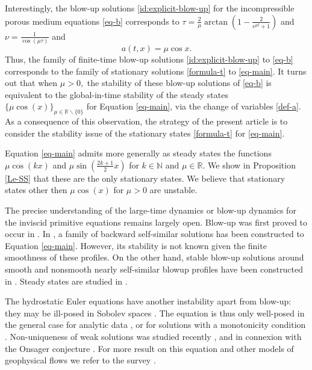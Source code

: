 \documentclass[12pt]{amsart}
\numberwithin{equation}{section}
\def\R{{\mathbb R}}
\numberwithin{equation}{section}
\begin{document}
\medskip

Interestingly, the blow-up solutions \eqref{id:explicit-blow-up} for the incompressible porous medium equations \eqref{eq-b} corresponds to $  \tau=\frac{2}{\mu}\arctan\left(1-\frac{2}{e^{\mu t}+1}\right)$ and $\nu= \frac{1}{\cos(\mu \tau)}$ and
   \begin{equation}\label{formula-t}
a(t,x)= \mu \cos x.
  \end{equation}
Thus, the family of finite-time blow-up solutions \eqref{id:explicit-blow-up} to \eqref{eq-b} corresponds to the family of stationary solutions \eqref{formula-t} to \eqref{eq-main}. It turns out  that  when $\mu>0,$ the  stability  of these blow-up solutions of \eqref{eq-b} is equivalent to  the  global-in-time stability  of the  steady states $\{\mu\cos(x)\}_{\mu\in\R\backslash\{0\}}$  for  Equation \eqref{eq-main},  via the change of variables \eqref{def-a}.    As a consequence of this observation, the strategy of the present article is to consider the stability issue of the stationary states \eqref{formula-t} for \eqref{eq-main}. 

Equation \eqref{eq-main} admits more generally as steady states the functions $\mu \cos(kx)$ and $\mu \sin(\frac{2k+1}{2}x)$ for $k\in \mathbb N$ and $\mu\in \mathbb R$. We show in Proposition \ref{Le-SS} that these are the only stationary states. We believe that stationary states other then $\mu \cos (x)$ for $\mu>0$ are unstable.

\medskip

The precise understanding of the large-time dynamics or blow-up dynamics for the inviscid primitive equations remains largely open. Blow-up was first proved to occur in \cite{CINT,Wo}. In \cite{CINT},  a family of backward self-similar solutions has been constructed to Equation \eqref{eq-main}.  However,  its stability is not known given the finite smoothness of these profiles.   On the other hand,    stable blow-up solutions around smooth and nonsmooth nearly self-similar blowup profiles have been constructed in  \cite{CIL}. Steady states are studied in \cite{LWX}.


The hydrostatic Euler equations have another instability apart from blow-up: they may be ill-posed in Sobolev spaces \cite{R,HN}. The equation is thus only well-posed in the general case for analytic data \cite{KTVZ,KTVZ2}, or for solutions with a monotonicity condition \cite{MW,KMVW}. Non-uniqueness of weak solutions was studied recently \cite{CM}, and in connexion with the Onsager conjecture \cite{BMT,BMT2}. For more result on this equation and other models of geophysical flows we refer to the survey \cite{LT}.
\end{document}
